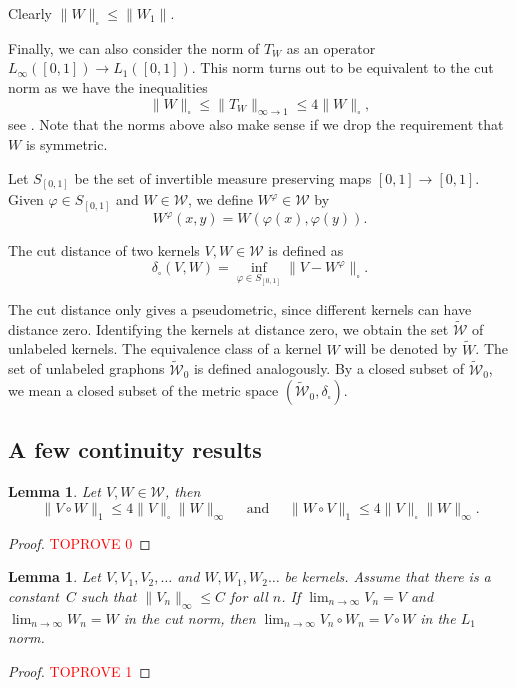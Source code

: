\documentclass[11pt,a4paper]{article}
\theoremstyle{plain}
\newtheorem{lemma}[theorem]{Lemma}
\theoremstyle{definition}
\begin{document}
Clearly $\|W\|_\square\le \|W_1\|$. 

Finally, we can also consider the norm of $T_W$ as an operator $L_{\infty}([0,1])\to L_1([0,1])$. This norm turns out to be equivalent to the cut norm as we have the inequalities
\begin{equation}\label{squarevsoperator}\|W\|_\square\le \|T_W\|_{\infty\to 1} \le 4\|W\|_\square,
\end{equation}
see \cite[Lemma 8.11]{lovasz2012large}. Note that the norms above also make sense if we drop the requirement that $W$ is symmetric.



Let $S_{[0,1]}$ be the set of invertible measure preserving maps $[0,1]\to [0,1]$. Given $\varphi\in S_{[0,1]}$ and $W\in \mathcal{W}$, we define $W^\varphi\in \mathcal{W}$ by
\[W^{\varphi}(x,y)=W(\varphi(x),\varphi(y)).\]

The cut distance of two kernels $V,W\in \mathcal{W}$ is defined as
\[\delta_\square(V,W)=\inf_{\varphi\in S_{[0,1]}} \|V-W^\varphi\|_\square.\]

The cut distance only gives a pseudometric, since different kernels can have distance zero. Identifying the kernels at distance zero, we obtain the set $\widetilde{\mathcal{W}}$ of unlabeled kernels. The equivalence class of a kernel $W$ will be denoted by $\widetilde{W}$. The set of unlabeled graphons $\widetilde{\mathcal{W}}_0$ is defined analogously. By a closed subset of $\widetilde{\mathcal{W}}_0$, we mean a closed subset of the metric space $(\widetilde{\mathcal{W}}_0,\delta_\square)$.


\subsection{A few continuity results}

\begin{lemma}\label{normofproduct}
Let $V,W\in\mathcal{W}$, then
\[\|V\circ W\|_1\le 4\|V\|_
\square \|W\|_{\infty}\quad\text{ and }\quad\|W\circ V\|_1\le 4\|V\|_
\square \|W\|_{\infty}.\]
\end{lemma}
\begin{proof}\textcolor{red}{TOPROVE 0}\end{proof}

\begin{lemma}\label{limitofproduct}
Let $V,V_1,V_2,\dots$ and $W,W_1,W_2\dots$ be kernels. Assume that there is a constant~$C$ such that  $\|V_n\|_\infty\le C$ for all $n$. If $\lim_{n\to\infty} V_n=V$ and $\lim_{n\to\infty} W_n=W$ in the cut norm, then $\lim_{n\to\infty} V_n\circ W_n=V\circ W$ in the $L_1$ norm.  
\end{lemma}
\begin{proof}\textcolor{red}{TOPROVE 1}\end{proof}
\end{document}
